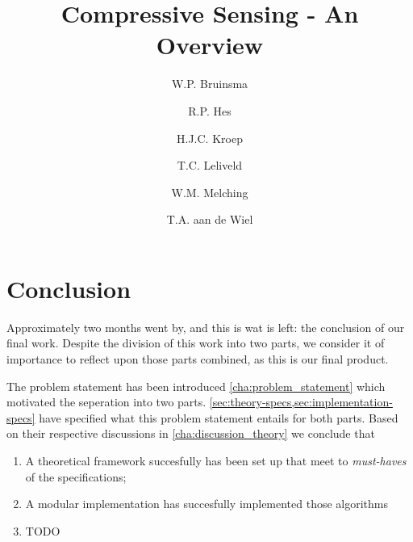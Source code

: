 \documentclass[a4paper, openany, oneside]{memoir}
\title{Compressive Sensing - An Overview}
\author{W.P. Bruinsma \and R.P. Hes \and H.J.C. Kroep \and T.C. Leliveld \and W.M. Melching \and T.A. aan de Wiel}
\begin{document}
\chapter{Conclusion}


Approximately two months went by, and this is wat is left: the conclusion of our final work. Despite the division of this work into two parts, we consider it of importance to reflect upon those parts combined, as this is our final product. 

The problem statement has been introduced \cref{cha:problem_statement} which motivated the seperation into two parts. \cref{sec:theory-specs,sec:implementation-specs} have specified what this problem statement entails for both parts. Based on their respective discussions in \cref{cha:discussion_theory} we conclude that

\begin{enumerate}
	\item A theoretical framework succesfully has been set up that meet to \emph{must-haves} of the specifications;
	\item A modular implementation has succesfully implemented those algorithms
	\item TODO
\end{enumerate} 
\end{document}
